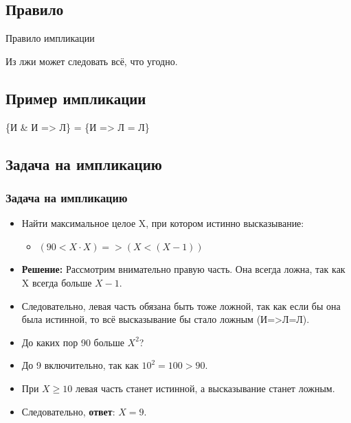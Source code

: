 \documentclass[compress,red]{beamer}
\begin{document}
\subsection{Правило}
\begin{frame}
  \begin{center}
    \Huge{Правило импликации}
  \end{center}
  \begin{center}
    \Large{Из лжи может следовать всё, что угодно.}
  \end{center}
\end{frame}

\subsection{Пример импликации}
\begin{frame}
  \begin{center}
    \Large{\{И \& И => Л\} = \{И => Л = Л\}}
  \end{center}
\end{frame}

\subsection{Задача на импликацию}
\begin{frame}[fragile]
  \frametitle{Задача на импликацию}
  \begin{itemize}[<+->]
    \item Найти максимальное целое X, при котором истинно высказывание:
        \begin{itemize}
            \item $(90 < X\cdot X) => (X < (X-1))$
        \end{itemize}
    \item \textbf{Решение:} Рассмотрим внимательно правую часть. Она всегда ложна, так как X всегда больше $X-1$.
    \item Следовательно, левая часть обязана быть тоже ложной, так как если бы она была истинной, то всё высказывание бы стало ложным (И=>Л=Л).
    \item До каких пор 90 больше $X^2$?
    \item До 9 включительно, так как $10^2 = 100 > 90$.
    \item При $X\geq 10$ левая часть станет истинной, а высказывание станет ложным.
    \item Следовательно, \textbf{ответ}: $X = 9$.
  \end{itemize}
\end{frame}
\end{document}
